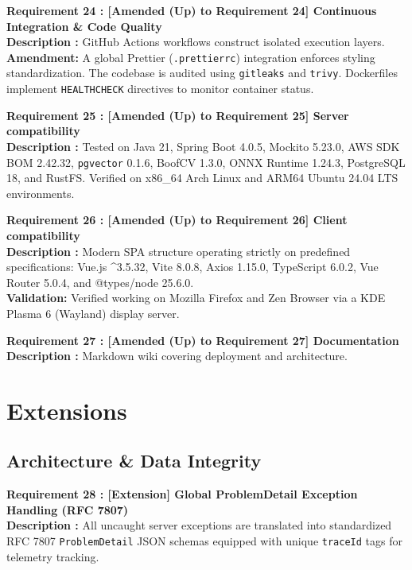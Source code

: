 \documentclass[12pt, a4paper]{article}
\begin{document}
\noindent\textbf{Requirement 24 : [Amended (Up) to Requirement 24] Continuous Integration \& Code Quality}\\
\textbf{Description :} GitHub Actions workflows construct isolated execution layers. \textbf{Amendment:} A global Prettier (\texttt{.prettierrc}) integration enforces styling standardization. The codebase is audited using \texttt{gitleaks} and \texttt{trivy}. Dockerfiles implement \texttt{HEALTHCHECK} directives to monitor container status.
\vspace{1em}

\noindent\textbf{Requirement 25 : [Amended (Up) to Requirement 25] Server compatibility}\\
\textbf{Description :} Tested on Java 21, Spring Boot 4.0.5, Mockito 5.23.0, AWS SDK BOM 2.42.32, \texttt{pgvector} 0.1.6, BoofCV 1.3.0, ONNX Runtime 1.24.3, PostgreSQL 18, and RustFS. Verified on x86\_64 Arch Linux and ARM64 Ubuntu 24.04 LTS environments.
\vspace{1em}

\noindent\textbf{Requirement 26 : [Amended (Up) to Requirement 26] Client compatibility}\\
\textbf{Description :} Modern SPA structure operating strictly on predefined specifications: Vue.js \textasciicircum3.5.32, Vite 8.0.8, Axios 1.15.0, TypeScript 6.0.2, Vue Router 5.0.4, and @types/node 25.6.0. \\
\textbf{Validation:} Verified working on Mozilla Firefox and Zen Browser via a KDE Plasma 6 (Wayland) display server.
\vspace{1em}

\noindent\textbf{Requirement 27 : [Amended (Up) to Requirement 27] Documentation}\\
\textbf{Description :} Markdown wiki covering deployment and architecture.

\clearpage

\section{Extensions}

\subsection*{Architecture \& Data Integrity}

\noindent\textbf{Requirement 28 : [Extension] Global ProblemDetail Exception Handling (RFC 7807)}\\
\textbf{Description :} All uncaught server exceptions are translated into standardized RFC 7807 \texttt{ProblemDetail} JSON schemas equipped with unique \texttt{traceId} tags for telemetry tracking.
\vspace{1em}
\end{document}
